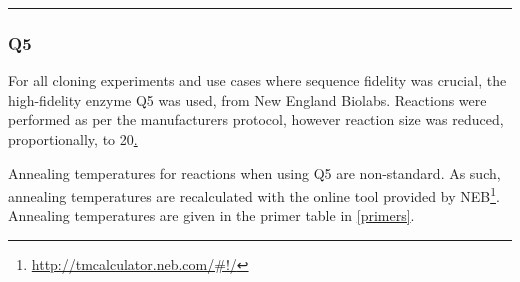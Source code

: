 \hrule

\normalsize
	\subsubsection{Q5}
	For all cloning experiments and use cases where sequence fidelity was crucial, the high-fidelity enzyme Q5 was used, from New England Biolabs. Reactions were performed as per the manufacturers protocol, however reaction size was reduced, proportionally, to 20\ul.
	
	Annealing temperatures for reactions when using Q5 are non-standard. As such, annealing temperatures are recalculated with the online tool provided by NEB\footnote{\url{http://tmcalculator.neb.com/\#!/}}. Annealing temperatures are given in the primer table in \vref{primers}.
\vspace{0.3cm}
